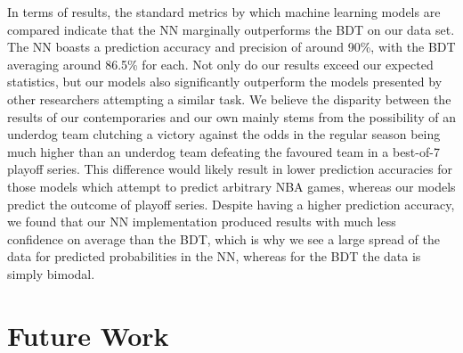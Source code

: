 \documentclass[letterpaper]{article} %
\begin{document}
In terms of results, the standard metrics by which machine learning models are compared indicate that the NN marginally outperforms the BDT on our data set. The NN boasts a prediction accuracy and precision of around 90\%, with the BDT averaging around 86.5\% for each. Not only do our results exceed our expected statistics, but our models also significantly outperform the models presented by other researchers attempting a similar task. We believe the disparity between the results of our contemporaries and our own mainly stems from the possibility of an underdog team clutching a victory against the odds in the regular season being much higher than an underdog team defeating the favoured team in a best-of-7 playoff series. This difference would likely result in lower prediction accuracies for those models which attempt to predict arbitrary NBA games, whereas our models predict the outcome of playoff series. Despite having a higher prediction accuracy, we found that our NN implementation produced results with much less confidence on average than the BDT, which is why we see a large spread of the data for predicted probabilities in the NN, whereas for the BDT the data is simply bimodal. 

\section{Future Work}
\end{document}
